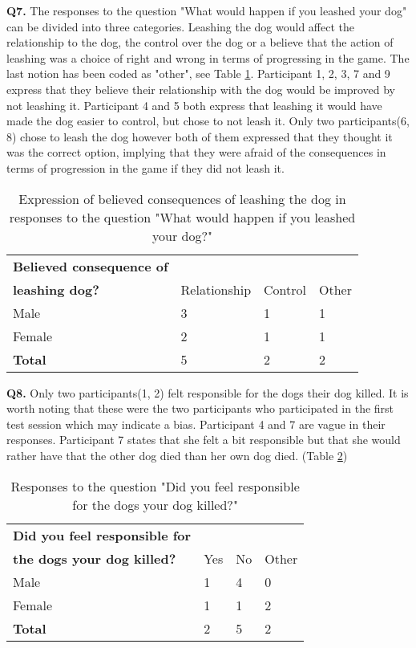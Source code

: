 \textbf{Q7.} The responses to the question "What would happen if you leashed your dog" can be divided into three categories. Leashing the dog would affect the relationship to the dog, the control over the dog or a believe that the action of leashing was a choice of right and wrong in terms of progressing in the game. The last notion has been coded as "other", see Table \ref{tab:leash}. Participant 1, 2, 3, 7 and 9 express that they believe their relationship with the dog would be improved by not leashing it. Participant 4 and 5 both express that leashing it would have made the dog easier to control, but chose to not leash it. Only two participants(6, 8) chose to leash the dog however both of them expressed that they thought it was the correct option, implying that they were afraid of the consequences in terms of progression in the game if they did not leash it.

\begin{table}[h]
\centering
\begin{tabular}{l l l l}
\hline
\textbf{Believed consequence of}\\
\textbf{leashing dog?} & Relationship & Control & Other \\
\hline
Male & 3 & 1 & 1 \\
Female & 2 & 1 & 1 \\
\textbf{Total} & 5 & 2 & 2 \\
\hline
\end{tabular}
\caption{\label{tab:leash}Expression of believed consequences of leashing the dog in responses to the question "What would happen if you leashed your dog?"}
\end{table}


\textbf{Q8.} Only two participants(1, 2) felt responsible for the dogs their dog killed. It is worth noting that these were the two participants who participated in the first test session which may indicate a bias. Participant 4 and 7 are vague in their responses. Participant 7 states that she felt a bit responsible but that she would rather have that the other dog died than her own dog died. (Table \ref{tab:resp})

\begin{table}[h]
\centering
\begin{tabular}{l l l l}
\hline
\textbf{Did you feel responsible for}\\
\textbf{the dogs your dog killed?} & Yes & No & Other \\
\hline
Male & 1 & 4 & 0 \\
Female & 1 & 1 & 2 \\
\textbf{Total} & 2 & 5 & 2 \\
\hline
\end{tabular}
\caption{\label{tab:resp}Responses to the question "Did you feel responsible for the dogs your dog killed?"}
\end{table}


